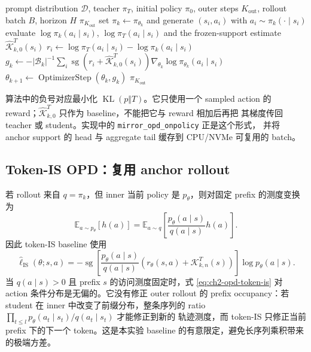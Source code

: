 \begin{algorithm}[ht]
\caption{On-policy OPD baseline\\{\small\textit{Semantics: 每个 outer step 用当前 student 重新 rollout；无 mirror 正则}}}
\begin{algorithmic}[1]
\Require prompt distribution $\mathcal D$, teacher $\pi_T$, initial policy $\pi_0$, outer steps $K_{\mathrm{out}}$, rollout batch $B$, horizon $H$
\Ensure $\pi_{K_{\mathrm{out}}}$
    \State set $\pi_k\gets\pi_{\theta_k}$ and generate $(s_i,a_i)$ with $a_i\sim\pi_k(\cdot\mid s_i)$
    \State evaluate $\log\pi_k(a_i\mid s_i)$, $\log\pi_T(a_i\mid s_i)$ and the frozen-support estimate $\widehat{\mathcal K}_{k,0}^{T}(s_i)$
    \State $r_i\gets\log\pi_T(a_i\mid s_i)-\log\pi_k(a_i\mid s_i)$
    \State $g_k\gets-|\mathcal B_k|^{-1}\sum_i\operatorname{sg}(r_i+\widehat{\mathcal K}_{k,0}^{T}(s_i))\nabla_{\theta_k}\log\pi_{\theta_k}(a_i\mid s_i)$
    \State $\theta_{k+1}\gets\operatorname{OptimizerStep}(\theta_k,g_k)$
\EndFor
\State \Return $\pi_{K_{\mathrm{out}}}$
\end{algorithmic}
\end{algorithm}

算法中的负号对应最小化 $\operatorname{KL}(p\Vert T)$。它只使用一个 sampled
action 的 reward；$\widehat{\mathcal K}_{k,0}^{T}$ 只作为 baseline，不能把它与 reward 相加后再把
其梯度传回 teacher 或 student。实现中的 \texttt{mirror\_opd\_onpolicy} 正是这个形式，
并将 anchor support 的 head 与 aggregate tail 缓存到 CPU/NVMe 可复用的 batch。

\subsection{Token-IS OPD：复用 anchor rollout}
\label{subsec:ch2-opd-is-baseline}

若 rollout 来自 $q=\pi_k$，但 inner 当前 policy 是 $p_\theta$，则对固定 prefix
的测度变换为
\begin{equation}
\label{eq:ch2-opd-token-is}
\mathbb E_{a\sim p_\theta}[h(a)]
 =\mathbb E_{a\sim q}
 \left[\frac{p_\theta(a\mid s)}{q(a\mid s)}h(a)\right].
\end{equation}
因此 token-IS baseline 使用
\begin{equation}
\widehat\ell_{\mathrm{IS}}(\theta;s,a)
 =-\operatorname{sg}\!\left[
 \frac{p_\theta(a\mid s)}{q(a\mid s)}
 \left(r_\theta(s,a)+\mathcal K_{k,n}^{T}(s)\right)\right]
 \log p_\theta(a\mid s).
\end{equation}
当 $q(a\mid s)>0$ 且 prefix $s$ 的访问测度固定时，式
\eqref{eq:ch2-opd-token-is} 对 action 条件分布是无偏的。它没有修正 outer
rollout 的 prefix occupancy：若 student 在 inner 中改变了前缀分布，整条序列的
ratio $\prod_{t\leq l}p_\theta(a_t\mid s_t)/q(a_t\mid s_t)$ 才能修正到新的
轨迹测度，而 token-IS 只修正当前 prefix 下的下一个 token。这是本实验 baseline
的有意限定，避免长序列乘积带来的极端方差。

